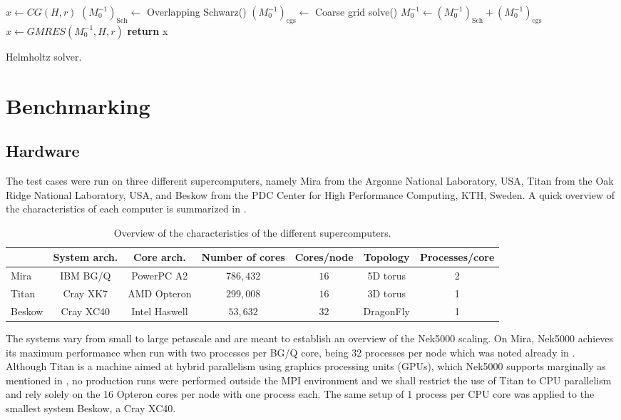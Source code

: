 \documentclass{sig-alternate}
\begin{document}
\begin{algorithm}
\begin{algorithmic}
\State $x \leftarrow CG(H, r)$
\State $\left(M_0^{-1}\right)_{\text{Sch}} \leftarrow$ Overlapping Schwarz()
\State $\left(M_0^{-1}\right)_{\text{cgs}} \leftarrow$ Coarse grid solve() %
\State $M_0^{-1} \leftarrow \left(M_0^{-1}\right)_{\text{Sch}} + \left(M_0^{-1}\right)_{\text{cgs}}$
\State $x \leftarrow GMRES(M_0^{-1}, H, r)$
\EndIf
\State \textbf{return} x
\EndProcedure
\end{algorithmic}
\caption{Helmholtz solver.}
\label{alg:helmholtz}
\end{algorithm}

\section{Benchmarking}
\label{sec:benchmarking}

\subsection{Hardware}
\label{sec:hardware}

The test cases were run on three different supercomputers, namely Mira from the
Argonne National Laboratory, USA, Titan from the Oak Ridge National Laboratory,
USA, and Beskow from the PDC Center for High Performance Computing, KTH, Sweden.
A quick overview of the characteristics of each computer is summarized in 
.
\begin{table}
\centering
\caption{Overview of the characteristics of the different supercomputers.}
\begin{tabular}{l|cccccc} 
\hline
 & System arch. & Core arch. & Number of cores & Cores/node & Topology & Processes/core \\
 \hline
Mira   & IBM BG/Q & PowerPC A2 & $786,432$ & $16$ & 5D torus  &2\\ 
Titan  & Cray XK7 & AMD Opteron & $299,008$ & $16$ & 3D torus  &1\\ 
Beskow & Cray XC40 & Intel Haswell & $53,632$  & $32$ & DragonFly &1\\
\hline
\end{tabular}
\label{tab:computer_charac}
\end{table}
The systems vary from small to large petascale and are meant to establish an overview of the Nek5000 scaling. On Mira, Nek5000 achieves its
maximum performance when run with two processes per BG/Q core, being 32 processes
per node which was noted already in \cite{fischer:scaling}. Although Titan is a
machine aimed at hybrid parallelism using graphics processing units (GPUs), which
Nek5000 supports marginally as mentioned in \cite{Otten2016}, no production runs
were performed outside the MPI environment and we shall restrict the use of
Titan to CPU parallelism and rely solely
on the 16 Opteron cores per node with one process each. The same setup of 1
process per CPU core was applied to the smallest system Beskow, a Cray XC40.
\end{document}
